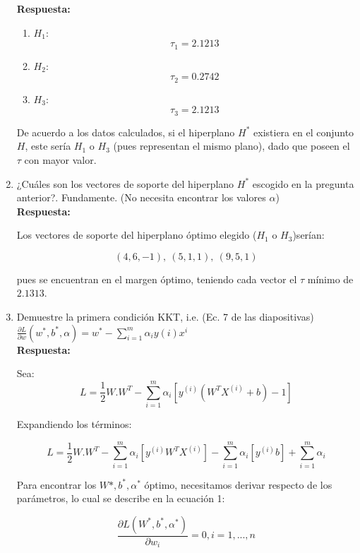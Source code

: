 \documentclass[paper=a4, fontsize=11pt]{scrartcl}
\numberwithin{equation}{section}		%
\numberwithin{figure}{section}			%
\numberwithin{table}{section}				%
\begin{document}
\begin{enumerate}
    \textbf{Respuesta:}
    
    \begin{enumerate}
        \item $H_1$:
                $$\tau_1 = 2.1213$$
                
        \item $H_2$:
                $$\tau_2 = 0.2742$$
                
        \item $H_3$:
                $$\tau_3 = 2.1213$$
    \end{enumerate}
    
    De acuerdo a los datos calculados, si el hiperplano $H^*$ existiera en el conjunto $H$, este sería $H_1$ o $H_3$ (pues representan el mismo plano), dado que poseen el $\tau$ con mayor valor.
    
    \item ¿Cuáles son los vectores de soporte del hiperplano $H^*$ escogido en la pregunta anterior?. Fundamente. (No necesita encontrar los valores $\alpha$)\\
    
    \textbf{Respuesta:}
    
    Los vectores de soporte del hiperplano óptimo elegido ($H_1$ o $H_3$)serían:
    
    $$(4,6,-1),\ (5,1,1),\ (9,5,1)$$
    
    pues se encuentran en el margen óptimo, teniendo cada vector el $\tau$ mínimo de $2.1313$.\\
    
    \item Demuestre la primera condición KKT, i.e. (Ec. 7 de las diapositivas) $\frac{\partial L}{\partial w}(w^*, b^*, \alpha) = w^* - \sum_{i=1}^{m}\alpha_iy(i)x^{i}$\\
    
    \textbf{Respuesta:}
    
    Sea: $$L = \frac{1}{2}W.W^T - \sum_{i=1}^{m}\alpha_i[y^{(i)}(W^{T}X^{(i)} + b) - 1]$$
    
    Expandiendo los términos:
    
    $$L = \frac{1}{2}W.W^T - \sum_{i=1}^{m}\alpha_i[y^{(i)}W^{T}X^{(i)}] - \sum_{i=1}^{m}\alpha_i[y^{(i)}b] + \sum_{i=1}^{m}\alpha_i$$
    
    Para encontrar los $W*, b^*, \alpha^*$ óptimo, necesitamos derivar respecto de los parámetros, lo cual se describe en la ecuación 1:
    
    $$\frac{\partial L(W^*, b^*, \alpha^* )}{\partial w_i}=0, i=1,...,n$$
    

\end{enumerate}
\end{document}
